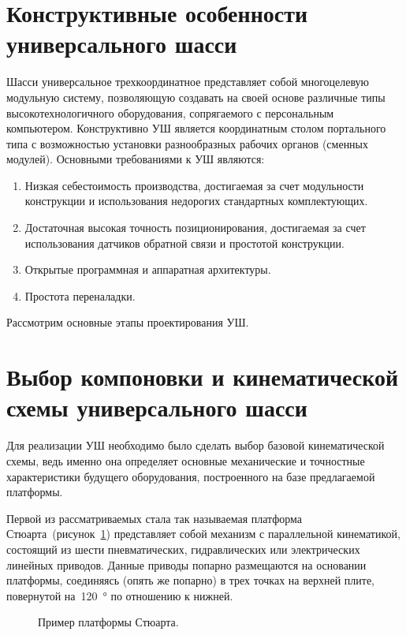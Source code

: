 \section{Конструктивные особенности универсального шасси}

Шасси универсальное трехкоординатное представляет собой многоцелевую модульную систему, позволяющую создавать на своей основе различные типы высокотехнологичного оборудования, сопрягаемого с персональным компьютером. Конструктивно УШ является координатным столом портального типа с возможностью установки разнообразных рабочих органов (сменных модулей). Основными требованиями к УШ являются:

\begin{enumerate}
	\item Низкая себестоимость производства, достигаемая за счет модульности конструкции и использования недорогих стандартных комплектующих.
	\item Достаточная высокая точность позиционирования, достигаемая за счет использования датчиков обратной связи и простотой конструкции.
	\item Открытые программная и аппаратная архитектуры.
	\item Простота переналадки.
\end{enumerate}

Рассмотрим основные этапы проектирования УШ.

\section{Выбор компоновки и кинематической схемы универсального шасси}

Для реализации УШ необходимо было сделать выбор базовой кинематической схемы, ведь именно она определяет основные механические и точностные характеристики будущего оборудования, построенного на базе предлагаемой платформы.

Первой из рассматриваемых стала так называемая платформа Стюарта~(рисунок~\cref{fig:stuart}) представляет собой механизм с параллельной кинематикой, состоящий из шести пневматических, гидравлических или электрических линейных приводов. Данные приводы попарно размещаются на основании платформы, соединяясь (опять же попарно) в трех точках на верхней плите, повернутой на~\SI{120}{\degree} по отношению к нижней.

\begin{figure}[ht]
	\caption{Пример платформы Стюарта.}\label{fig:stuart}
\end{figure}

